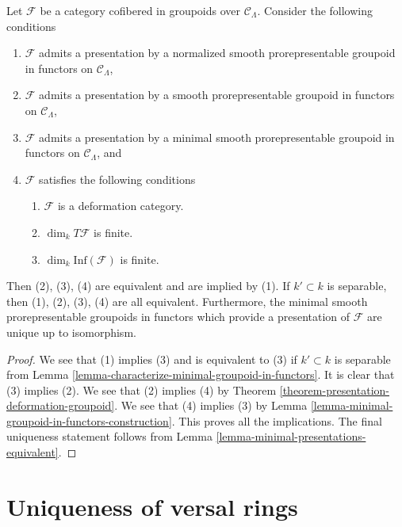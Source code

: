 \begin{theorem}
\label{theorem-minimal-smooth-prorepresentable-presentations}
Let $\mathcal{F}$ be a category cofibered in groupoids over
$\mathcal{C}_\Lambda$. Consider the following conditions
\begin{enumerate}
\item $\mathcal{F}$ admits a presentation by a normalized
smooth prorepresentable groupoid in functors on $\mathcal{C}_\Lambda$,
\item $\mathcal{F}$ admits a presentation by a
smooth prorepresentable groupoid in functors on $\mathcal{C}_\Lambda$,
\item $\mathcal{F}$ admits a presentation by a minimal
smooth prorepresentable groupoid in functors on $\mathcal{C}_\Lambda$, and
\item $\mathcal{F}$ satisfies the following conditions
\begin{enumerate}
\item $\mathcal{F}$ is a deformation category.
\item $\dim_k T\mathcal{F}$ is finite.
\item $\dim_k \text{Inf}(\mathcal{F})$ is finite.
\end{enumerate}
\end{enumerate}
Then (2), (3), (4) are equivalent and are implied by (1).
If $k' \subset k$ is separable, then (1), (2), (3), (4) are all equivalent.
Furthermore, the minimal smooth prorepresentable groupoids in functors
which provide a presentation of $\mathcal{F}$ are unique up to isomorphism.
\end{theorem}

\begin{proof}
We see that (1) implies (3) and is equivalent to (3) if
$k' \subset k$ is separable from
Lemma \ref{lemma-characterize-minimal-groupoid-in-functors}.
It is clear that (3) implies (2). We see that (2) implies (4) by
Theorem \ref{theorem-presentation-deformation-groupoid}.
We see that (4) implies (3) by
Lemma \ref{lemma-minimal-groupoid-in-functors-construction}.
This proves all the implications.
The final uniqueness statement follows from
Lemma \ref{lemma-minimal-presentations-equivalent}.
\end{proof}








\section{Uniqueness of versal rings}
\label{section-uniqueness}

